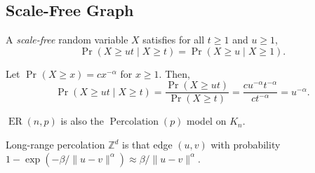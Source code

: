 \subsection{Scale-Free Graph}
\begin{definition}
	A \emph{scale-free} random variable \(X\) satisfies for all \(t \geq 1\) and \(u \geq 1\),
	\[
		\Pr_{}\left(X \geq ut \mid X \geq t\right)
		= \Pr_{}\left(X \geq u \mid X \geq 1\right).
	\]
\end{definition}

\begin{eg}
	Let \(\Pr_{}\left(X \geq x\right) = c x^{-\alpha }\) for \(x \geq 1\). Then,
	\[
		\Pr_{}\left(X \geq u t \mid X \geq t\right)
		= \frac{\Pr_{}\left(X \geq ut\right) }{\Pr_{}\left(X \geq t\right) }
		= \frac{c u^{-\alpha } t^{- \alpha }}{c t^{-\alpha }}
		= u^{-\alpha }.
	\]
\end{eg}

\begin{notation}
	\(\operatorname{ER}(n, p) \) is also the \(\operatorname{Percolation}(p) \) model on \(K_n\).
\end{notation}

\begin{notation}
	Long-range percolation \(\mathbb{Z} ^d\) is that edge \((u, v)\) with probability \(1 - \exp (- \beta / \lVert u - v \rVert ^\alpha ) \approx \beta / \lVert u - v \rVert ^{\alpha }\).
\end{notation}